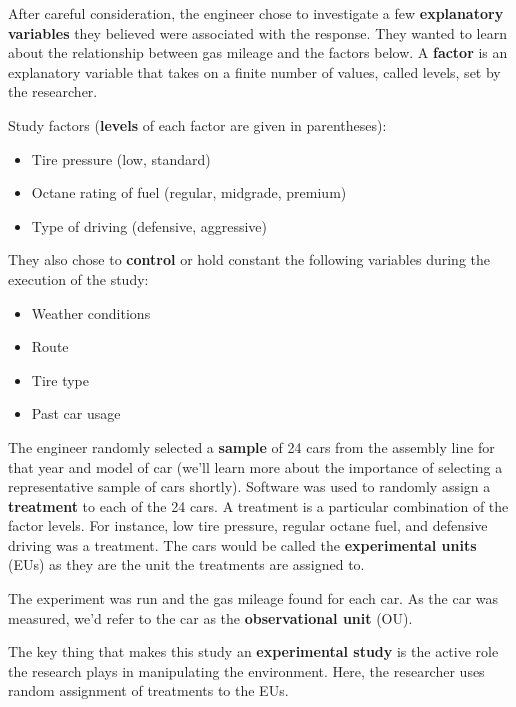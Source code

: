 \documentclass[
]{book}
\providecommand{\tightlist}{%
  \setlength{\itemsep}{0pt}\setlength{\parskip}{0pt}}
\theoremstyle{definition}
\theoremstyle{definition}
\theoremstyle{definition}
\theoremstyle{remark}
\begin{document}
After careful consideration, the engineer chose to investigate a few \textbf{explanatory variables} they believed were associated with the response. They wanted to learn about the relationship between gas mileage and the factors below. A \textbf{factor} is an explanatory variable that takes on a finite number of values, called levels, set by the researcher.

Study factors (\textbf{levels} of each factor are given in parentheses):

\begin{itemize}
\tightlist
\item
  Tire pressure (low, standard)\\
\item
  Octane rating of fuel (regular, midgrade, premium)\\
\item
  Type of driving (defensive, aggressive)
\end{itemize}

They also chose to \textbf{control} or hold constant the following variables during the execution of the study:

\begin{itemize}
\tightlist
\item
  Weather conditions\\
\item
  Route\\
\item
  Tire type\\
\item
  Past car usage
\end{itemize}

The engineer randomly selected a \textbf{sample} of 24 cars from the assembly line for that year and model of car (we'll learn more about the importance of selecting a representative sample of cars shortly). Software was used to randomly assign a \textbf{treatment} to each of the 24 cars. A treatment is a particular combination of the factor levels. For instance, low tire pressure, regular octane fuel, and defensive driving was a treatment. The cars would be called the \textbf{experimental units} (EUs) as they are the unit the treatments are assigned to.

The experiment was run and the gas mileage found for each car. As the car was measured, we'd refer to the car as the \textbf{observational unit} (OU).

The key thing that makes this study an \textbf{experimental study} is the active role the research plays in manipulating the environment. Here, the researcher uses random assignment of treatments to the EUs.
\end{document}
